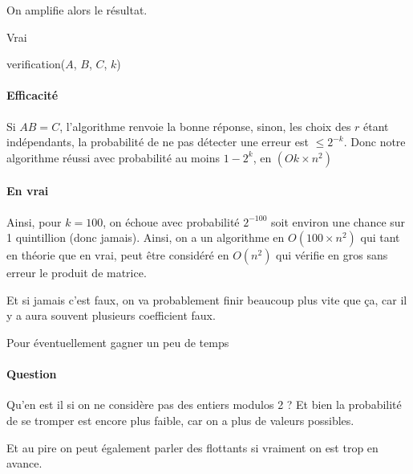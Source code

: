 On amplifie alors le résultat.

\begin{algorithm}[H]
	\Retour Vrai
	\caption{verification($A$, $B$, $C$, $k$)}
\end{algorithm}

\paragraph{Efficacité} Si $AB = C$, l'algorithme renvoie la bonne réponse, sinon, les choix des $r$ étant indépendants, la probabilité de ne pas détecter une erreur est $\leq 2^{-k}$. Donc notre algorithme réussi avec probabilité au moins $1-2^k$, en $(Ok\times n^2)$

\paragraph{En vrai} Ainsi, pour $k = 100$, on échoue avec probabilité $2^{-100}$ soit environ une chance sur 1 quintillion (donc jamais). Ainsi, on a un algorithme en $O(100 \times n^2)$ qui tant en théorie que en vrai, peut être considéré en $O(n^2)$ qui vérifie en gros sans erreur le produit de matrice.

\begin{com}
	Et si jamais c'est faux, on va probablement finir beaucoup plus vite que ça, car il y a aura souvent plusieurs coefficient faux.
\end{com}

\begin{com}
	Pour éventuellement gagner un peu de temps
\end{com}

\paragraph{Question} Qu'en est il si on ne considère pas des entiers modulos 2 ? Et bien la probabilité de se tromper est encore plus faible, car on a plus de valeurs possibles.

\begin{com}
	Et au pire on peut également parler des flottants si vraiment on est trop en avance.
\end{com}